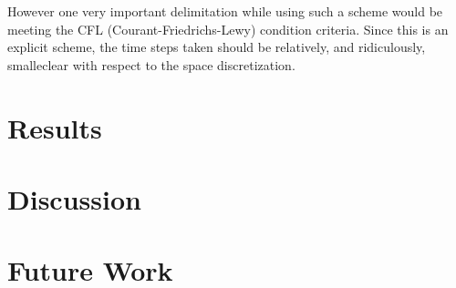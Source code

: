 \documentclass[a4paper,10pt]{IEEEtran}
\begin{document}
	However one very important delimitation while using such a scheme would be meeting the CFL (Courant-Friedrichs-Lewy) condition criteria. Since this is an explicit scheme, the time steps taken should be relatively, and ridiculously, smalleclear with respect to the space discretization. 
	
	
	 
	
	\section{Results}
	
	\section{Discussion}
	\section{Future Work}
	
	
	\begin{thebibliography}{1}
		
	\end{thebibliography}
\end{document}
